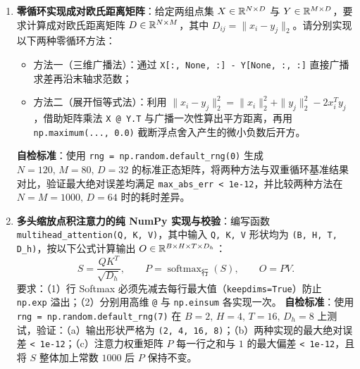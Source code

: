 
\begin{enumerate}[label=\textbf{1.\arabic*}, resume]
  \item \textbf{零循环实现成对欧氏距离矩阵}：给定两组点集 $X \in \mathbb{R}^{N \times D}$ 与 $Y \in \mathbb{R}^{M \times D}$，要求计算成对欧氏距离矩阵 $D \in \mathbb{R}^{N \times M}$，其中 $D_{ij} = \|x_i - y_j\|_2$。请分别实现以下两种零循环方法：
  \begin{itemize}
    \item 方法一（三维广播法）：通过 \texttt{X[:, None, :] - Y[None, :, :]} 直接广播求差再沿末轴求范数；
    \item 方法二（展开恒等式法）：利用 $\|x_i - y_j\|_2^2 = \|x_i\|_2^2 + \|y_j\|_2^2 - 2 x_i^T y_j$，借助矩阵乘法 \texttt{X @ Y.T} 与广播一次性算出平方距离，再用 \texttt{np.maximum(..., 0.0)} 截断浮点舍入产生的微小负数后开方。
  \end{itemize}
  \textbf{自检标准}：使用 \texttt{rng = np.random.default\_rng(0)} 生成 $N=120,\, M=80,\, D=32$ 的标准正态矩阵，将两种方法与双重循环基准结果对比，验证最大绝对误差均满足 \texttt{max\_abs\_err < 1e-12}，并比较两种方法在 $N=M=1000,\, D=64$ 时的耗时差异。

  \item \textbf{多头缩放点积注意力的纯 NumPy 实现与校验}：编写函数 \texttt{multihead\_attention(Q, K, V)}，其中输入 \texttt{Q, K, V} 形状均为 \texttt{(B, H, T, D\_h)}，按以下公式计算输出 $O \in \mathbb{R}^{B \times H \times T \times D_h}$：
  \[
  S = \frac{Q K^T}{\sqrt{D_h}}, \qquad
  P = \operatorname{softmax}_{\text{行}}(S), \qquad
  O = P V.
  \]
  要求：（1）行 Softmax 必须先减去每行最大值（\texttt{keepdims=True}）防止 \texttt{np.exp} 溢出；（2）分别用高维 \texttt{@} 与 \texttt{np.einsum} 各实现一次。
  \textbf{自检标准}：使用 \texttt{rng = np.random.default\_rng(7)} 在 $B=2,\, H=4,\, T=16,\, D_h=8$ 上测试，验证：（a）输出形状严格为 \texttt{(2, 4, 16, 8)}；（b）两种实现的最大绝对误差 \texttt{< 1e-12}；（c）注意力权重矩阵 $P$ 每一行之和与 $1$ 的最大偏差 \texttt{< 1e-12}，且将 $S$ 整体加上常数 $1000$ 后 $P$ 保持不变。
\end{enumerate}
